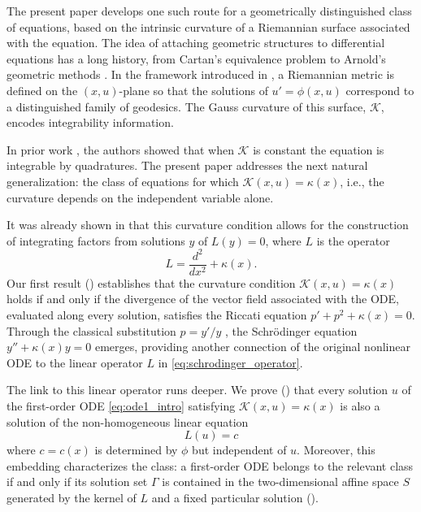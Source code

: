 \documentclass[preprint,a4paper]{elsarticle}
\begin{document}
The present paper develops one such route for a geometrically distinguished class of equations, based on the intrinsic curvature of a Riemannian surface associated with the equation. The idea of attaching geometric structures to differential equations has a long history, from Cartan's equivalence problem \cite{Olver1995} to Arnold's geometric methods \cite{ArnoldODE1992}. In the framework introduced in \cite{Bayrakdar2018a,surfaces2025,integrationJacobifields}, a Riemannian metric is defined on the $(x,u)$-plane so that the solutions of $u' = \phi(x,u)$ correspond to a distinguished family of geodesics. The Gauss curvature of this surface, $\mathcal K$, encodes integrability information. 

In prior work \cite{surfaces2025, integrationJacobifields}, the authors showed that when $\mathcal{K}$ is constant the equation is integrable by quadratures. The present paper addresses the next natural generalization: the class of equations for which $\mathcal{K}(x,u) = \kappa(x)$, i.e., the curvature depends on the independent variable alone.

It was already shown in \cite{integrationJacobifields} that this curvature condition allows for the construction of integrating factors from solutions $y$ of $L(y)=0$, where $L$ is the operator
\begin{equation}\label{eq:schrodinger_operator}
L=\frac{d^2}{dx^2}+\kappa(x).
\end{equation}
Our first result () establishes that the curvature condition $\mathcal{K}(x,u) = \kappa(x)$ holds if and only if the divergence of the vector field associated with the ODE, evaluated along every solution, satisfies the Riccati equation $p'+p^2+\kappa(x)=0$. Through the classical substitution $p=y'/y$ \cite{Ince1956, Reid1972}, the Schr\"odinger equation $y''+\kappa(x)y=0$ emerges, providing another connection of the original nonlinear ODE to the linear operator $L$ in \eqref{eq:schrodinger_operator}.


The link to this linear operator runs deeper. We prove () that every solution $u$ of the first-order ODE \eqref{eq:ode1_intro} satisfying $\mathcal{K}(x,u)=\kappa(x)$ is also a solution of the non-homogeneous linear equation 
\begin{equation}\label{eq:nonhomog_intro}
L(u)=c
\end{equation}
where $c=c(x)$ is determined by $\phi$ but independent of $u$. Moreover, this embedding characterizes the class: a first-order ODE belongs to the relevant class if and only if its solution set $\Gamma$ is contained in the two-dimensional affine space $S$ generated by the kernel of $L$ and a fixed particular solution (). 
\end{document}
